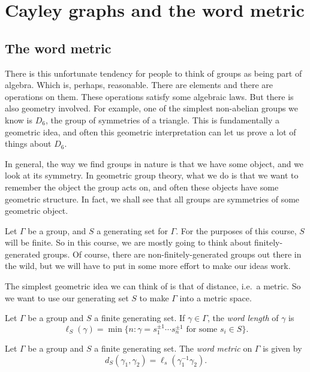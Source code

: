 \documentclass[a4paper]{article}
\begin{document}
\tableofcontents

\section{Cayley graphs and the word metric}
\subsection{The word metric}
There is this unfortunate tendency for people to think of groups as being part of algebra. Which is, perhaps, reasonable. There are elements and there are operations on them. These operations satisfy some algebraic laws. But there is also geometry involved. For example, one of the simplest non-abelian groups we know is $D_6$, the group of symmetries of a triangle. This is fundamentally a geometric idea, and often this geometric interpretation can let us prove a lot of things about $D_6$.

In general, the way we find groups in nature is that we have some object, and we look at its symmetry. In geometric group theory, what we do is that we want to remember the object the group acts on, and often these objects have some geometric structure. In fact, we shall see that all groups are symmetries of some geometric object.

Let $\Gamma$ be a group, and $S$ a generating set for $\Gamma$. For the purposes of this course, $S$ will be finite. So in this course, we are mostly going to think about finitely-generated groups. Of course, there are non-finitely-generated groups out there in the wild, but we will have to put in some more effort to make our ideas work.

The simplest geometric idea we can think of is that of distance, i.e.\ a metric. So we want to use our generating set $S$ to make $\Gamma$ into a metric space.

\begin{defi}
  Let $\Gamma$ be a group and $S$ a finite generating set. If $\gamma \in \Gamma$, the \emph{word length} of $\gamma$ is
  \[
    \ell_S(\gamma) = \min \{n : \gamma = s_1^{\pm 1} \cdots s_n^{\pm 1}\text{ for some } s_i \in S\}.
  \]
\end{defi}

\begin{defi}
  Let $\Gamma$ be a group and $S$ a finite generating set. The \emph{word metric} on $\Gamma$ is given by
  \[
    d_S (\gamma_1, \gamma_2) = \ell_s(\gamma_1^{-1} \gamma_2).
  \]
\end{defi}
\end{document}
